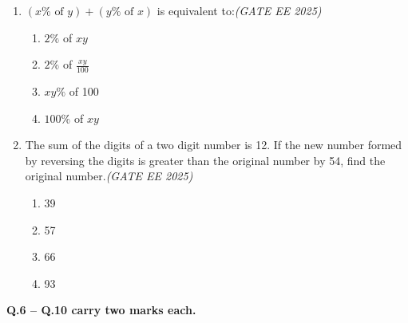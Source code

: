 \documentclass[11pt,a4paper]{article}
\begin{document}
\begin{enumerate}[leftmargin=0pt,label=\textbf{Q.\arabic*}]
\vspace{1em}

\item $(x \% \text{ of } y) + (y \% \text{ of } x)$ is equivalent to:\hfill \textit{(GATE EE 2025)}

\begin{multicols}{2}
\begin{enumerate}[label=(\Alph*)]
\item $2 \%$ of $xy$
\item $2 \%$ of $\frac{xy}{100}$
\item $xy \%$ of 100
\item $100 \%$ of $xy$
\end{enumerate}
\end{multicols}

\vspace{1em}

\item The sum of the digits of a two digit number is 12. If the new number formed by reversing the digits is greater than the original number by 54, find the original number.\hfill \textit{(GATE EE 2025)}

\begin{multicols}{2}
\begin{enumerate}[label=(\Alph*)]
\item 39
\item 57
\item 66
\item 93
\end{enumerate}

\end{multicols}

\end{enumerate}


\noindent \textbf{Q.6 -- Q.10 carry two marks each.}
\end{document}
